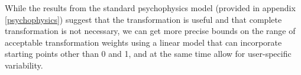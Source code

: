 \documentclass[12pt]{article}\usepackage[]{graphicx}\usepackage[]{color}
\newcommand{\newdo}[1]{\todo[inline, color=Plum]{#1}} %
\begin{document}



While the results from the standard psychophysics model (provided in appendix \ref{psychophysics}) suggest that the transformation is useful and that complete transformation is not necessary, we can get more precise bounds on the range of acceptable transformation weights using a linear model that can incorporate starting points other than 0 and 1, and at the same time allow for user-specific variability.  %


\end{document}

